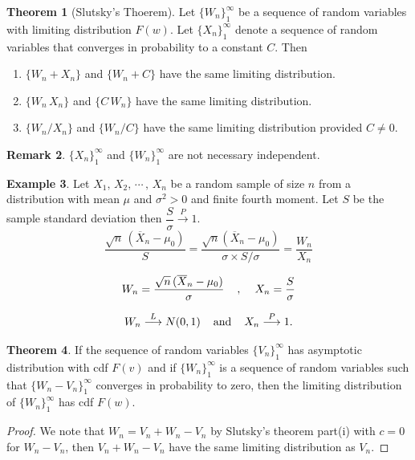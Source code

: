\documentclass[12pt,a4paper]{report}
\theoremstyle{definition}
\newtheorem{thm}{Theorem}[section]
\newtheorem{exa}[thm]{Example}
\newtheorem{remark}[thm]{Remark}
\theoremstyle{plain}
\begin{document}
\begin{thm}[Slutsky's Thoerem]
Let $\{W_n\}^{\infty}_1$ be a sequence of random variables with limiting distribution $F(w)$. Let $\{X_n\}^{\infty}_1$ denote a sequence of random variables that converges in probability to a constant $C$. Then
\begin{enumerate}
\item[(i)] $\{W_n + X_n\}$ and $\{W_n + C\}$ have the same limiting distribution.
\item[(ii)] $\{W_n\, X_n\}$ and $\{C\, W_n\}$ have the same limiting distribution.
\item[(iii)] $\{W_n/X_n\}$ and $\{W_n/C\}$ have the same limiting distribution provided $C\neq 0$.
\end{enumerate}
\end{thm}


\begin{remark}
$\{X_n\}^{\infty}_1$ and $\{W_n\}^{\infty}_1$ are not necessary independent.
\end{remark}


\begin{exa}
Let $X_1, \, X_2, \, \cdots\,, \, X_n$ be a random sample of size $n$ from a distribution with mean $\mu$ and $\sigma^2 > 0$ and finite fourth moment. Let $S$ be the sample standard deviation then $\dfrac{S}{\sigma}\overset{P}{\longrightarrow}1.$
$$\frac{\sqrt{n}\, (\overline{X}_n -\mu_0)}{S} = \frac{\sqrt{n}(\overline{X}_n - \mu_0)}{\sigma\times S/\sigma} = \frac{W_n}{X_n}$$

$$W_n = \frac{\sqrt{n}\, (\overline{X}_n - \mu_0)}{\sigma}\hspace{0.4cm}, \hspace{0.4cm} X_n  = \frac{S}{\sigma}$$

$$W_n \overset{L}{\longrightarrow} N(0,1)\hspace{0.4cm}\text{and}\hspace{0.4cm} X_n\overset{P}{\longrightarrow}1.$$
\end{exa}



\begin{thm}
If the sequence of random variables $\{V_n\}^{\infty}_1$ has asymptotic distribution with cdf $F(v)$ and if $\{W_n\}^{\infty}_1$ is a sequence of random variables such that $\{W_n - V_n\}^{\infty}_1$ converges in probability to zero, then the limiting distribution of $\{W_n\}^{\infty}_1$ has cdf $F(w)$.
\end{thm}

\begin{proof}
We note that $W_n = V_n + W_n - V_n$ by Slutsky's theorem part(i) with $c = 0$ for $W_n - V_n$, then $V_n + W_n - V_n$ have the same limiting distribution as $V_n$.
\end{proof}
\end{document}
